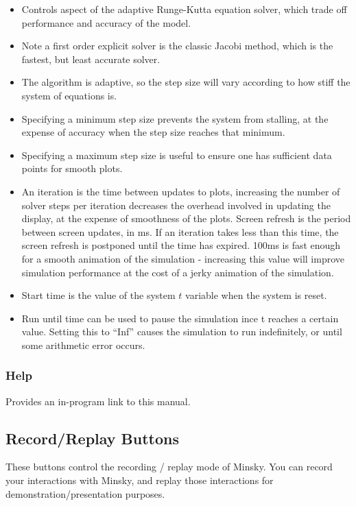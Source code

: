 \begin{itemize}
\item Controls aspect of the adaptive Runge-Kutta equation solver, which
trade off performance and accuracy of the model. 
\item Note a first order explicit solver is the classic Jacobi method, which is the fastest,
but least accurate solver. 
\item The algorithm is adaptive, so the
step size will vary according to how stiff the system of equations
is. 
\item Specifying a minimum step size prevents the system from stalling,
at the expense of accuracy when the step size reaches that
minimum. 
\item Specifying a maximum step size is useful to ensure one has
sufficient data points for smooth plots.
\item An iteration is the time between updates to plots, increasing the
number of solver steps per iteration decreases the overhead involved
in updating the display, at the expense of smoothness of the
plots. Screen refresh is the period between screen updates, in ms. If
an iteration takes less than this time, the screen refresh is postponed
until the time has expired. 100ms is fast enough for a smooth
animation of the simulation - increasing this value will improve
simulation performance at the cost of a jerky animation of the
simulation.
\item Start time is the value of the system $t$ variable when the
  system is reset.
\item Run until time can be used to pause the simulation ince t
  reaches a certain value. Setting this to ``Inf'' causes the
  simulation to run indefinitely, or until some arithmetic error
  occurs.
\end{itemize}

\subsubsection{Help}
\label{Help}

Provides an in-program link to this manual.

\subsection{Record/Replay Buttons}
\label{RecReplayButtons}


These buttons control the recording / replay mode of Minsky. You can
record your interactions with Minsky, and replay those interactions
for demonstration/presentation purposes. 

